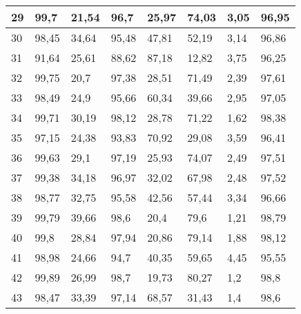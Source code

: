 \begin{longtable}[c]{|l|l|l|l|l|l|l|l|}
29              & 99,7         & 21,54        & 96,7        & 25,97         & 74,03         & 3,05          & 96,95         \\ \hline
30              & 98,45        & 34,64        & 95,48       & 47,81         & 52,19         & 3,14          & 96,86         \\ \hline
31              & 91,64        & 25,61        & 88,62       & 87,18         & 12,82         & 3,75          & 96,25         \\ \hline
32              & 99,75        & 20,7         & 97,38       & 28,51         & 71,49         & 2,39          & 97,61         \\ \hline
33              & 98,49        & 24,9         & 95,66       & 60,34         & 39,66         & 2,95          & 97,05         \\ \hline
34              & 99,71        & 30,19        & 98,12       & 28,78         & 71,22         & 1,62          & 98,38         \\ \hline
35              & 97,15        & 24,38        & 93,83       & 70,92         & 29,08         & 3,59          & 96,41         \\ \hline
36              & 99,63        & 29,1         & 97,19       & 25,93         & 74,07         & 2,49          & 97,51         \\ \hline
37              & 99,38        & 34,18        & 96,97       & 32,02         & 67,98         & 2,48          & 97,52         \\ \hline
38              & 98,77        & 32,75        & 95,58       & 42,56         & 57,44         & 3,34          & 96,66         \\ \hline
39              & 99,79        & 39,66        & 98,6        & 20,4          & 79,6          & 1,21          & 98,79         \\ \hline
40              & 99,8         & 28,84        & 97,94       & 20,86         & 79,14         & 1,88          & 98,12         \\ \hline
41              & 98,98        & 24,66        & 94,7        & 40,35         & 59,65         & 4,45          & 95,55         \\ \hline
42              & 99,89        & 26,99        & 98,7        & 19,73         & 80,27         & 1,2           & 98,8          \\ \hline
43              & 98,47        & 33,39        & 97,14       & 68,57         & 31,43         & 1,4           & 98,6          \\ \hline

\end{longtable}
